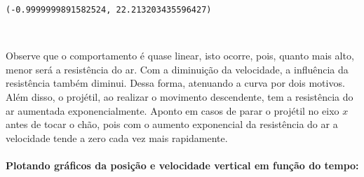 \documentclass[12pt, a4paper]{article}
\makeatletter
\newcommand{\boxspacing}{\kern\kvtcb@left@rule\kern\kvtcb@boxsep}
\newcommand{\prompt}[4]{
        {\ttfamily\llap{{\color{#2}[#3]:\hspace{3pt}#4}}\vspace{-\baselineskip}}
    }
\makeatother
\begin{document}
            \begin{tcolorbox}[breakable, size=fbox, boxrule=.5pt, pad at break*=1mm, opacityfill=0]
\prompt{Out}{outcolor}{23}{\boxspacing}
\begin{Verbatim}[commandchars=\\\{\}]
(-0.9999999891582524, 22.213203435596427)
\end{Verbatim}
\end{tcolorbox}
        
    \begin{center}
    \end{center}
    { \hspace*{\fill} \\}
    
    Observe que o comportamento é quase linear, isto ocorre, pois, quanto
mais alto, menor será a resistência do ar. Com a diminuição da
velocidade, a influência da resistência também diminui. Dessa forma,
atenuando a curva por dois motivos. Além disso, o projétil, ao realizar
o movimento descendente, tem a resistência do ar aumentada
exponencialmente. Aponto em casos de parar o projétil no eixo \(x\)
antes de tocar o chão, pois com o aumento exponencial da resistência do
ar a velocidade tende a zero cada vez mais rapidamente.

\hypertarget{plotando-gruxe1ficos-da-posiuxe7uxe3o-e-velocidade-vertical-em-funuxe7uxe3o-do-tempo}{%
\paragraph{Plotando gráficos da posição e velocidade vertical em função
do
tempo:}\label{plotando-gruxe1ficos-da-posiuxe7uxe3o-e-velocidade-vertical-em-funuxe7uxe3o-do-tempo}}
\end{document}
